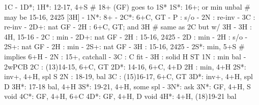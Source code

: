 1C - 1D*;
1H*: 12-17, 4+S  # 18+ (GF) goes to 1S*
1S*: 16+; or min unbal  # may be 15-16, 2425 [3H]
   - 1N*: 8+
        - 2C*: 6+C, GT
             - P  : s/o
             - 2N : re-inv
             - 3C : re-inv
        - 2D+: nat GF
        - 2H : 6+C, GT; and 3H  # same as 2C but w/ 3H
        - 3H : 4H, 15-16
   - 2C : min
        - 2D+: nat GF
        - 2H : 15-16, 2425
   - 2D : min
        - 2H : s/o
        - 2S+: nat GF
   - 2H : min
        - 2S+: nat GF
        - 3H : 15-16, 2425
   - 2S*: min, 5+S  # implies 6+H
   - 2N : 15+, catchall
   - 3C : C fit 
   - 3H : solid H ST
1N : min bal
   - 2wPCB
2C : (13)14-15, 6+C, GT
2D*: 14-16, 6+C, 4+D
2H : min, 4+H
2S*: inv+, 4+H, spl S
2N : 18-19, bal
3C : (15)16-17, 6+C, GT
3D*: inv+, 4+H, spl D
3H*: 17-18 bal, 4+H
3S*: 19-21, 4+H, some spl
   - 3N*: ask
3N*: GF, 4+H, S void 
4C*: GF, 4+H, 6+C
4D*: GF, 4+H, D void 
4H*: 4+H, (18)19-21 bal
